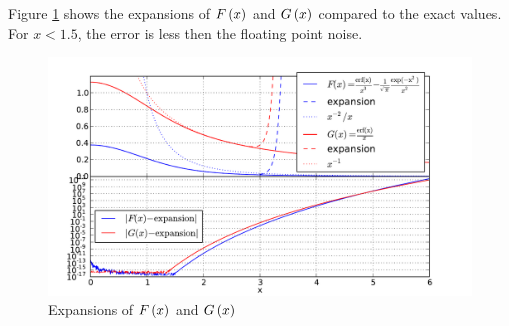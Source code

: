 \documentclass[12pt,letterpaper]{article}
\begin{document}
Figure \ref{fig:expansions_F_G} shows the expansions of $F\left( x \right)$ and $G\left( x \right)$
compared to the exact values. For $x < 1.5$, the error is less then the floating
point noise.

\begin{figure}
    \includegraphics[width=0.98\columnwidth]{expansions_F_G}
    \caption{Expansions of $F\left( x \right)$ and $G\left( x \right)$}
    \label{fig:expansions_F_G}
\end{figure}






% 
% 
\end{document}
